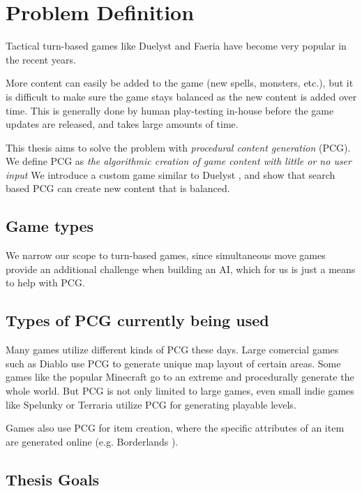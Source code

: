 \chapter{Problem Definition}

Tactical turn-based games like Duelyst and Faeria 
have become very popular in the recent years.

More content can easily be added to the game (new spells, monsters, etc.),
but it is difficult to make sure the game stays balanced as the new content
is added over time. This is generally done by human play-testing 
in-house before the game updates are released, and takes large amounts of time.

This thesis aims to solve the problem with \emph{procedural content generation} (PCG).
We define PCG as \emph{the algorithmic creation of game content with little or no user input}
\citep{pcgbook} We introduce a custom game similar to Duelyst \citet{duelyst}, and show that
search based PCG can create new content that is balanced.

\section{Game types}

We narrow our scope to turn-based games, since simultaneous move games provide
an additional challenge when building an AI, which for us is just a means to help
with PCG.

\section{Types of PCG currently being used}

Many games utilize different kinds of PCG these days. Large comercial games such as Diablo \citep{diablo}
use PCG to generate unique map layout of certain areas. Some games like the popular Minecraft \citep{minecraft}
go to an extreme and procedurally generate the whole world. But PCG is not only limited to large games,
even small indie games like Spelunky \citep{spelunky} or Terraria \citep{spelunky} utilize PCG for generating
playable levels.

Games also use PCG for item creation, where the specific attributes of an item are generated
online (e.g. Borderlands \citet{borderlands}).

\section{Thesis Goals}

